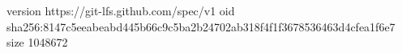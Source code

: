 version https://git-lfs.github.com/spec/v1
oid sha256:8147c5eeabeabd445b66c9c5ba2b24702ab318f4f1f3678536463d4cfea1f6e7
size 1048672
